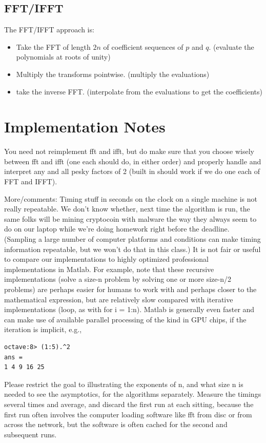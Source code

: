 \documentclass[lang=cn,11pt]{elegantbook}
\begin{document}
\subsection*{FFT/IFFT}
The FFT/IFFT approach is:
\begin{itemize}
    \item Take the FFT of length $2n$ of coefficient sequences of $p$ and $q$. (evaluate the polynomials at roots of unity)
    \item Multiply the transforms pointwise. (multiply the evaluations)
    \item take the inverse FFT. (interpolate from the evaluations to get the coefficients)
\end{itemize}

\section*{Implementation Notes}
You need not reimplement fft and ifft, but do make sure that you choose wisely between fft and ifft (one each should do, in either order) and properly handle and interpret any and all pesky factors of 2 (built in should work if we do one each of FFT and IFFT).

More/comments: Timing stuff in seconds on the clock on a single machine is not really repeatable. We don’t know whether, next time the algorithm is run, the same folks will be mining cryptocoin with malware the way they always seem to do on our laptop while we’re doing homework right before the deadline. (Sampling a large number of computer platforms and conditions can make timing information repeatable, but we won’t do that in this class.) It is not fair or useful to compare our implementations to highly optimized professional implementations in Matlab. For example, note that these recursive implementations (solve a size-n problem by solving one or more size-n/2 problems) are perhaps easier for humans to work with and perhaps closer to the mathematical expression, but are relatively slow compared with iterative implementations (loop,
as with for i = 1:n). Matlab is generally even faster and can make use of available parallel processing of the kind in GPU chips, if the iteration is implicit, e.g.,
\begin{verbatim}
octave:8> (1:5).^2
ans =
1 4 9 16 25
\end{verbatim}
Please restrict the goal to illustrating the exponents of n, and what size n is needed to see the asymptotics, for the algorithms separately. Measure the timings several times and average, and discard the first run at each sitting, because the first run often involves the computer loading software like fft from disc or from across the network, but the software is often cached for the second and subsequent runs.
\end{document}
